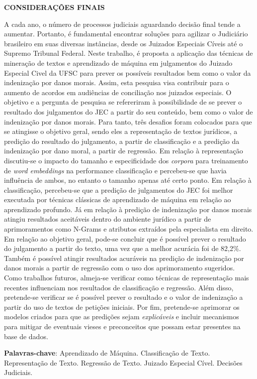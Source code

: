 \begin{resumo}
\textbf{\textsf{CONSIDERAÇÕES FINAIS}}

A cada ano, o número de processos judiciais aguardando decisão final tende a aumentar. Portanto, é fundamental encontrar soluções para agilizar o Judiciário brasileiro em suas diversas instâncias, desde os Juizados Especiais Cíveis até o Supremo Tribunal Federal.
Neste trabalho, é proposta a aplicação das técnicas de mineração de textos e aprendizado de máquina em julgamentos do Juizado Especial Civel da UFSC para prever os possíveis resultados bem como o valor da indenização por danos morais. Assim, esta pesquisa visa contribuir para o aumento de acordos em audiências de conciliação nos juizados especiais. 
O objetivo e a pergunta de pesquisa se refereriram à possibilidade de se prever o resultado dos julgamentos do JEC a partir do seu conteúdo, bem como  o valor de indenização por danos morais. Para tanto, três desafios foram colocados para que se atingisse o objetivo geral, sendo eles a representação de textos jurídicos, a predição do resultado do julgamento, a partir de classificação e a predição da indenização por dano moral, a partir de regressão.
Em relação à representação discutiu-se o impacto do tamanho e especificidade dos \textit{corpora} para treinamento de \textit{word embeddings} na performance classificação e percebeu-se que havia influência de ambos, no entanto o tamanho apenas até certo ponto. Em relação à classificação,  percebeu-se que a predição de julgamentos do JEC foi melhor executada por técnicas clássicas de aprendizado de máquina em relação ao aprendizado profundo. Já em relação à predição de indenização por danos morais atingiu resultados aceitáveis dentro do ambiente jurídico a partir de aprimoramentos como N-Grams e atributos extraídos pela especialista em direito. Em relação ao objetivo geral, pode-se concluir que é possível prever o resultado do julgamento a partir do texto, uma vez que a melhor acurácia foi de 82,2\%. Também é possível atingir resultados acuráveis na predição de indenização por danos morais a partir de regressão com o uso dos aprimoramento sugeridos.
Como trabalhos futuros, almeja-se verificar como técnicas de representação mais recentes influenciam nos resultados de classificação e regressão. Além disso, pretende-se verificar se é possível prever o resultado e o valor de indenização a partir do uso de textos de petições iniciais. Por fim, pretende-se aprimorar os modelos criados para que as predições sejam \textit{explicáveis} e incluir mecanismos para mitigar de eventuais vieses e preconceitos que possam estar presentes na base de dados.


\textbf{\textsf{Palavras-chave}}: Aprendizado de Máquina. Classificação de Texto. Representação de Texto. Regressão de Texto. Juizado Especial Cível. Decisões Judiciais.
\end{resumo}